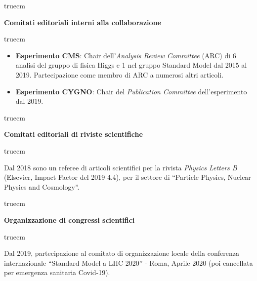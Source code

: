 \documentclass[11pt,twoside,a4paper]{article}
\begin{document}
\clearpage

 truecm
\begin{center}
\textbf{Comitati editoriali interni alla collaborazione}
\end{center}
 truecm

\begin{itemize}
\item \textbf{Esperimento CMS}: Chair dell'\textit{Analysis Review
  Committee} (ARC) di 6 analisi del gruppo di fisica Higgs e 1 nel
  gruppo Standard Model dal 2015 al 2019. Partecipazione come membro
  di ARC a numerosi altri articoli.
\item \textbf{Esperimento CYGNO}: Chair del \textit{Publication
  Committee} dell'esperimento dal 2019.
\end{itemize}


 truecm
\begin{center}
\textbf{Comitati editoriali di riviste scientifiche}
\end{center}
 truecm

Dal 2018 sono un referee di articoli scientifici per la rivista
\textit{Physics Letters B} (Elsevier, Impact Factor del 2019 4.4), per
il settore di ``Particle Physics, Nuclear Physics and Cosmology''.


 truecm
\begin{center}
\textbf{Organizzazione di congressi scientifici}
\end{center}
 truecm

Dal 2019, partecipazione al comitato di organizzazione locale della
conferenza internazionale ``Standard Model a LHC 2020'' - Roma, Aprile
2020 (poi cancellata per emergenza sanitaria Covid-19).
\end{document}
